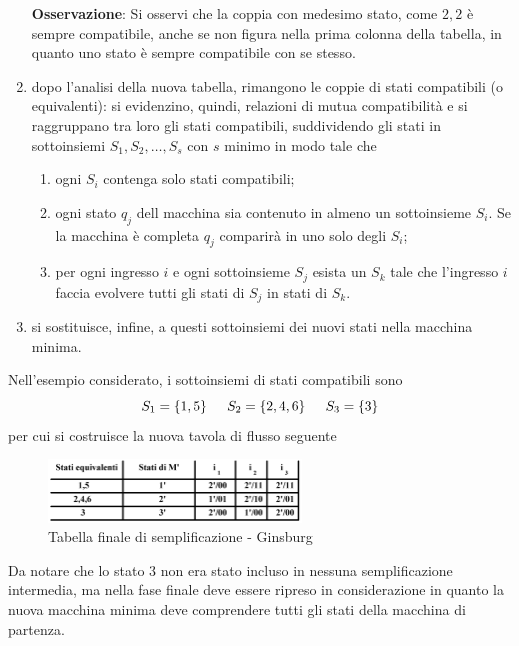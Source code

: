 \documentclass[a4paper]{extarticle}
\begin{document}
\begin{enumerate}
    \vspace{1em}
    \noindent
    \textbf{Osservazione}: Si osservi che la coppia con medesimo stato, come $2,2$ è sempre compatibile, anche se non figura nella prima colonna della tabella, in quanto uno stato è sempre compatibile con se stesso.

    \item dopo l'analisi della nuova tabella, rimangono le coppie di stati compatibili (o equivalenti): si evidenzino, quindi, relazioni di mutua compatibilità e si raggruppano tra loro gli stati compatibili, suddividendo gli stati in sottoinsiemi $S_1, S_2,\dots,S_s$ con $s$ minimo in modo tale che
    \begin{enumerate}
        \item ogni $S_i$ contenga solo stati compatibili;
        \item ogni stato $q_j$ dell macchina sia contenuto in almeno un sottoinsieme $S_i$. Se la macchina è completa $q_j$ comparirà in uno solo degli $S_i$;
        \item per ogni ingresso $i$ e ogni sottoinsieme $S_j$ esista un $S_k$ tale che l'ingresso $i$ faccia evolvere tutti gli stati di $S_j$ in stati di $S_k$.
    \end{enumerate}
    
    \item si sostituisce, infine, a questi sottoinsiemi dei nuovi stati nella macchina minima.
\end{enumerate}
Nell'esempio considerato, i sottoinsiemi di stati compatibili sono
\[S_1 = \{1,5\} \hspace{1.5em} S_2 = \{2,4,6\} \hspace{1.5em} S_3=\{3\}\]
per cui si costruisce la nuova tavola di flusso seguente
\begin{figure}[H]
    \centering
    \includegraphics[width=0.6\textwidth]{metodo-ginsburg-3.png}
    \caption{Tabella finale di semplificazione - Ginsburg}
    \label{fig:metodo_ginsburg_3}
\end{figure}
Da notare che lo stato $3$ non era stato incluso in nessuna semplificazione intermedia, ma nella fase finale deve essere ripreso in considerazione in quanto la nuova macchina minima deve comprendere tutti gli stati della macchina di partenza.\\
\end{document}
